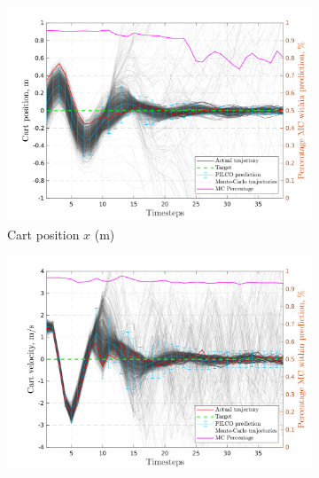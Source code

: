 

\begin{figure}[H]    
   \begin{subfigure}[b]{1\linewidth}
    \centering
    \includegraphics[height=0.4\textheight,width=1\textwidth]{Chapter3/Figures/cp_MC_rollout_Ep_15_Dim_1.png} 
    \caption{Cart position $x$ (m)} 
    \label{Fig:Re-cp-cart-position} 
  \end{subfigure} 
  \begin{subfigure}[b]{1\linewidth}
    \centering
    \includegraphics[height=0.4\textheight,width=1\textwidth]{Chapter3/Figures/cp_MC_rollout_Ep_15_Dim_2.png} 

\end{subfigure}
\end{figure}
